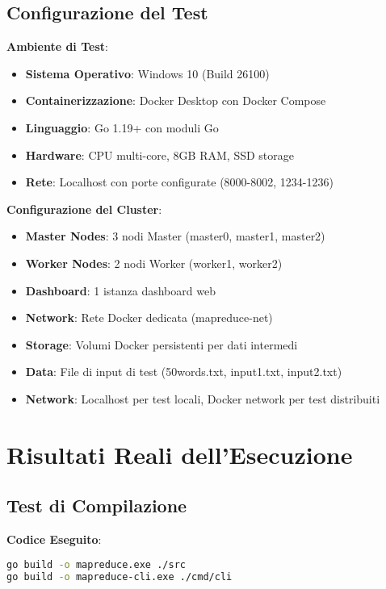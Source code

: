 \documentclass[12pt,a4paper]{article}
\begin{document}
\subsection{Configurazione del Test}

\textbf{Ambiente di Test}:
\begin{itemize}
\item \textbf{Sistema Operativo}: Windows 10 (Build 26100)
\item \textbf{Containerizzazione}: Docker Desktop con Docker Compose
\item \textbf{Linguaggio}: Go 1.19+ con moduli Go
\item \textbf{Hardware}: CPU multi-core, 8GB RAM, SSD storage
\item \textbf{Rete}: Localhost con porte configurate (8000-8002, 1234-1236)
\end{itemize}

\textbf{Configurazione del Cluster}:
\begin{itemize}
\item \textbf{Master Nodes}: 3 nodi Master (master0, master1, master2)
\item \textbf{Worker Nodes}: 2 nodi Worker (worker1, worker2)
\item \textbf{Dashboard}: 1 istanza dashboard web
\item \textbf{Network}: Rete Docker dedicata (mapreduce-net)
\item \textbf{Storage}: Volumi Docker persistenti per dati intermedi
\item \textbf{Data}: File di input di test (50words.txt, input1.txt, input2.txt)
\item \textbf{Network}: Localhost per test locali, Docker network per test distribuiti
\end{itemize}

\section{Risultati Reali dell'Esecuzione}

\subsection{Test di Compilazione}

\textbf{Codice Eseguito}:
\begin{lstlisting}[language=bash]
go build -o mapreduce.exe ./src
go build -o mapreduce-cli.exe ./cmd/cli
\end{lstlisting}
\end{document}
